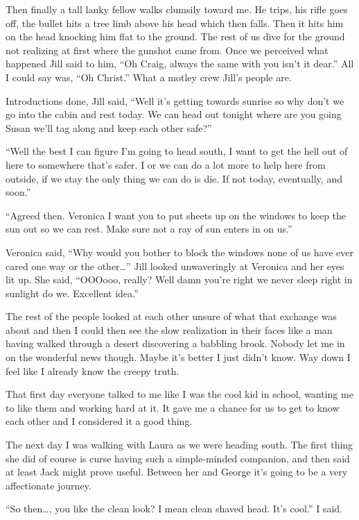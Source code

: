 Then finally a tall lanky fellow walks clumsily toward me. He trips, his rifle goes off, the bullet hits a tree limb above his head which then falls. Then it hits him on the head knocking him flat to the ground. The rest of us dive for the ground not realizing at first where the gunshot came from. Once we perceived what happened Jill said to him, ``Oh Craig, always the same with you isn't it dear.'' All I could say was, ``Oh Christ.'' What a motley crew Jill's people are.

Introductions done, Jill said, ``Well it's getting towards sunrise so why don't we go into the cabin and rest today. We can head out tonight where are you going Susan we'll tag along and keep each other safe?''

``Well the best I can figure I'm going to head south, I want to get the hell out of here to somewhere that's safer. I or we can do a lot more to help here from outside, if we stay the only thing we can do is die. If not today, eventually, and soon.''

``Agreed then. Veronica I want you to put sheets up on the windows to keep the sun out so we can rest. Make sure not a ray of sun enters in on us.''

Veronica said, ``Why would you bother to block the windows none of us have ever cared one way or the other\dots'' Jill looked unwaveringly at Veronica and her eyes lit up. She said, ``OOOooo, really? Well damn you're right we never sleep right in sunlight do we. Excellent idea.''

The rest of the people looked at each other unsure of what that exchange was about and then I could then see the slow realization in their faces like a man having walked through a desert discovering a babbling brook. Nobody let me in on the wonderful news though. Maybe it's better I just didn't know. Way down I feel like I already know the creepy truth.

That first day everyone talked to me like I was the cool kid in school, wanting me to like them and working hard at it. It gave me a chance for us to get to know each other and I considered it a good thing.

The next day I was walking with Laura as we were heading south. The first thing she did of course is curse having such a simple-minded companion, and then said at least Jack might prove useful. Between her and George it's going to be a very affectionate journey.

``So then\dots , you like the clean look? I mean clean shaved head. It's cool.'' I said.

